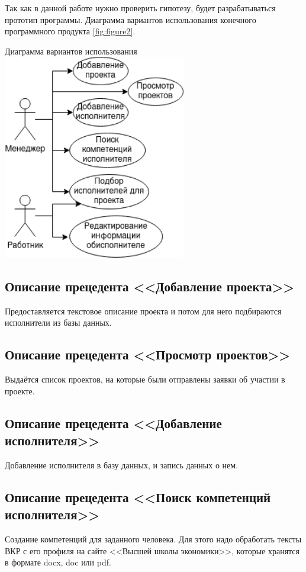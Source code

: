 \documentclass[PI,KR]{HSEUniversity}
\begin{document}
Так как в данной работе нужно проверить гипотезу, будет разрабатываться прототип программы. Диаграмма вариантов использования конечного программного продукта \ref{fig:figure2}.
\begin{FIGURE}[h]{Диаграмма вариантов использования \label{fig:figure2}}
	\includegraphics[width=0.6\textwidth]{img/Диаграмма вариантов использования}
\end{FIGURE}

\subsection{Описание прецедента <<Добавление проекта>>}
Предоставляется текстовое описание проекта и потом для него подбираются исполнители из базы данных.
\subsection{Описание прецедента <<Просмотр проектов>>}
Выдаётся список проектов, на которые были отправлены заявки об участии в проекте.
\subsection{Описание прецедента <<Добавление исполнителя>>}
Добавление исполнителя в базу данных, и запись данных о нем.
\subsection{Описание прецедента <<Поиск компетенций исполнителя>>}
Создание компетенций для заданного человека. Для этого надо обработать тексты ВКР с его профиля на сайте <<Высшей школы экономики>>, которые хранятся в формате docx, doc или pdf.
\end{document}
